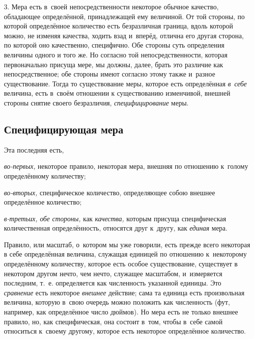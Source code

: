 3. Мера есть в~своей непосредственности некоторое обычное качество, обладающее
определённой, принадлежащей ему величиной. От той стороны, по которой
определённое количество есть безразличная граница, вдоль которой можно, не
изменяя качества, ходить взад и~вперёд, отлична его другая сторона, по которой
оно качественно, специфично. Обе стороны суть определения величины одного и
того же. Но согласно той непосредственности, которая первоначально присуща
мере, мы должны, далее, брать это различие как непосредственное; обе стороны
имеют согласно этому также и~разное существование. Тогда то существование меры,
которое есть определённая {\em в~себе} величина, есть в~своём отношении к
существованию изменчивой, внешней стороны снятие своего безразличия,
{\em специфицирование} меры.

\subsection{Специфицирующая мера}

Эта последняя есть,

{\em во-первых,} некоторое правило, некоторая мера, внешняя
по отношению к~голому определённому количеству;

{\em во-вторых,} специфическое количество, определяющее собою внешнее
определённое количество;

{\em в-третьих, обе стороны,} как {\em качества,} которым присуща
специфическая количественная определённость, относятся друг к~другу, как
{\em единая} мера.


Правило, или масштаб, о~котором мы уже говорили, есть прежде всего некоторая в
себе определённая величина, служащая единицей по отношению к~некоторому
определённому количеству, которое есть особое существование, существует в
некотором другом нечто, чем нечто, служащее масштабом, и~измеряется последним,
т.~е. определяется как численность указанной единицы. Это {\em сравнение} есть
некоторое {\em внешнее} действие; сама та единица есть произвольная величина, которую
в~свою очередь можно положить как численность (фут, например, как определённое
число дюймов). Но мера есть не только внешнее правило, но, как специфическая,
она состоит в~том, чтобы в~себе самой относиться к~своему другому, которое есть
некоторое определённое количество.

